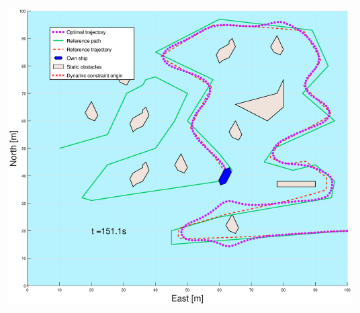 \begin{figure}[!ht]
    \hfill
    \begin{subfigure}[b]{0.499\textwidth}
        \centering
        \includegraphics[width=\textwidth]{Images/Figures/skjergard_u_trafikk/_Simple_1fig999_time=151}
    \end{subfigure}
    \hfill
\end{figure}%
